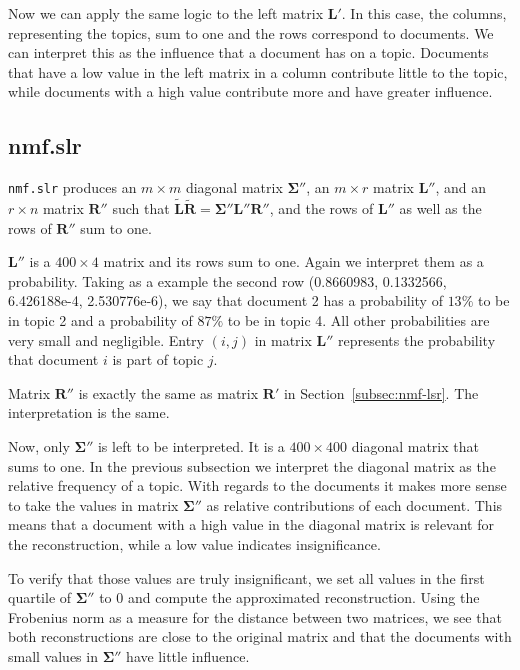 \documentclass{support/acm_proc_article-sp}
\begin{document}
    Now we can apply the same logic to the left matrix $\mathbf{L'}$.
    In this case, the columns, representing the topics, sum to one and the rows correspond to documents.
    We can interpret this as the influence that a document has on a topic.
    Documents that have a low value in the left matrix in a column contribute little to the topic, while documents with
    a high value contribute more and have greater influence.


    \subsection{nmf.slr}
    \label{subsec:nmf-slr}

    \lstinline{nmf.slr} produces an $m \times m$ diagonal matrix $\mathbf{\Sigma''}$, an $m \times r$ matrix $\mathbf{L''}$,
    and an $r \times n$ matrix $\mathbf{R''}$ such that $\mathbf{\tilde{L}\tilde{R}} = \mathbf{\Sigma''}\mathbf{L''}\mathbf{R''}$,
    and the rows of $\mathbf{L''}$ as well as the rows of $\mathbf{R''}$ sum to one.

    $\mathbf{L''}$ is a $400 \times 4$ matrix and its rows sum to one.
    Again we interpret them as a probability.
    Taking as a example the second row (0.8660983, 0.1332566, 6.426188e-4, 2.530776e-6), we say that document 2
    has a probability of $13\%$ to be in topic 2 and a probability of $87\%$ to be in topic 4.
    All other probabilities are very small and negligible.
    Entry $(i,j)$ in matrix $\mathbf{L''}$ represents the probability that document $i$ is part of topic $j$.

    Matrix  $\mathbf{R''}$ is exactly the same as matrix $\mathbf{R'}$ in Section~\ref{subsec:nmf-lsr}.
    The interpretation is the same.

    Now, only $\mathbf{\Sigma''}$ is left to be interpreted.
    It is a $400 \times 400$ diagonal matrix that sums to one.
    In the previous subsection we interpret the diagonal matrix as the relative frequency of a topic.
    With regards to the documents it makes more sense to take the values in matrix $\mathbf{\Sigma''}$ as relative
    contributions of each document.
    This means that a document with a high value in the diagonal matrix is relevant for the reconstruction, while
    a low value indicates insignificance.

    To verify that those values are truly insignificant, we set all values in the first quartile of $\mathbf{\Sigma''}$
    to 0 and compute the approximated reconstruction.
    Using the Frobenius norm as a measure for the distance between two matrices, we see that both reconstructions are close
    to the original matrix and that the documents with small values in $\mathbf{\Sigma''}$ have little influence.
\end{document}
